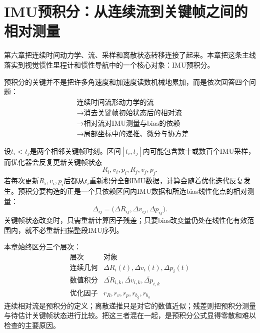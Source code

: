 \chapter{IMU预积分：从连续流到关键帧之间的相对测量}


\newenvironment{imucase}[1]{%
    \par\noindent\textbf{\color{main}例：#1}\rmfamily\par
}{%
    \par\ignorespacesafterend
}

第六章把连续时间动力学、流、采样和离散状态转移连接了起来。本章把这条主线落实到视觉惯性里程计和惯性导航中的一个核心对象：IMU预积分。

预积分的关键并不是把许多角速度和加速度读数机械地累加，而是依次回答四个问题：
\[
\boxed{
\begin{aligned}
&\text{连续时间流形动力学的流}\\
&\longrightarrow\text{消去关键帧初始状态后的相对流}\\
&\longrightarrow\text{相对流对IMU测量与bias的依赖}\\
&\longrightarrow\text{局部坐标中的递推、微分与协方差}
\end{aligned}
}
\]

设$t_i<t_j$是两个相邻关键帧时刻。区间$[t_i,t_j]$内可能包含数十或数百个IMU采样，而优化器会反复更新关键帧状态
\[
    R_i,v_i,p_i,R_j,v_j,p_j.
\]
若每次更新$R_i,v_i,p_i$后都从$t_i$重新积分全部IMU数据，计算会随着优化迭代反复发生。预积分要构造的正是一个只依赖区间内IMU数据和所选bias线性化点的相对测量：
\[
    \Delta_{ij}
    =\bigl(\Delta R_{ij},\Delta v_{ij},\Delta p_{ij}\bigr).
\]
关键帧状态改变时，只需重新计算因子残差；只要bias改变量仍处在线性化有效范围内，就不必重新扫描整段IMU序列。

本章始终区分三个层次：
\[
\begin{array}{c|c}
\text{层次} & \text{对象}\\ \hline
\text{连续几何} & \Delta R_i(t),\Delta v_i(t),\Delta p_i(t)\\
\text{数值积分} & \bar{\Delta R}_{i,k},\bar{\Delta v}_{i,k},\bar{\Delta p}_{i,k}\\
\text{优化因子} & r_R,r_v,r_p,r_{b_g},r_{b_a}
\end{array}
\]
连续相对流是预积分的定义；离散递推只是对它的数值近似；残差则把预积分测量与待估计关键帧状态进行比较。把这三者混在一起，是预积分公式显得零散和难以检查的主要原因。


